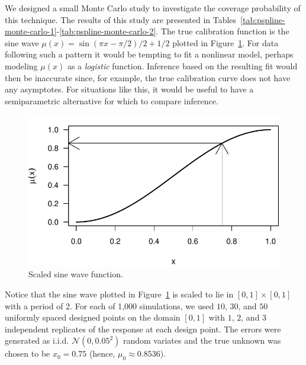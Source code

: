 \documentclass[cmfont,usenames,dvipsnames,leqno]{afit-etd}\usepackage[]{graphicx}\usepackage[]{color}
\makeatletter
\def\maxwidth{ %
  \ifdim\Gin@nat@width>\linewidth
    \linewidth
  \else
    \Gin@nat@width
  \fi
}
\newenvironment{knitrout}{}{} %
\renewenvironment{knitrout}{\begin{singlespace}}{\end{singlespace}}
\newcommand{\mc}[1]{\ensuremath{\mathcal{#1}}}
\makeatother
\begin{document}
We designed a small Monte Carlo study to investigate the coverage probability of this technique. The results of this study are presented in Tables~\ref{tab:pspline-monte-carlo-1}-\ref{tab:pspline-monte-carlo-2}. The true calibration function is the sine wave $\mu(x) = \sin(\pi x - \pi/2)/2 + 1/2$ plotted in Figure~\ref{fig:sine-wave}. For data following such a pattern it would be tempting to fit a nonlinear model, perhaps modeling $\mu(x)$ as a \textit{logistic} function. Inference based on the resulting fit would then be inaccurate since, for example, the true calibration curve does not have any asymptotes. For situations like this, it would be useful to have a semiparametric alternative for which to compare inference.

\begin{knitrout}
\color{fgcolor}\begin{figure}[H]

\includegraphics[width=\maxwidth]{figure/sine-wave} \caption[Scaled sine wave function]{Scaled sine wave function.\label{fig:sine-wave}}
\end{figure}


\end{knitrout}


Notice that the sine wave plotted in Figure~\ref{fig:sine-wave} is scaled to lie in $[0, 1] \times [0, 1]$ with a period of 2. For each of 1,000 simulations, we used $10$, $30$, and $50$ uniformly spaced designed points on the domain $[0, 1]$ with $1$, $2$, and $3$ independent replicates of the response at each design point. The errors were generated as i.i.d. $\mc{N}(0, 0.05^2)$ random variates and the true unknown was chosen to be $x_0 = 0.75$ (hence, $\mu_0 \approx 0.8536$).
\end{document}
